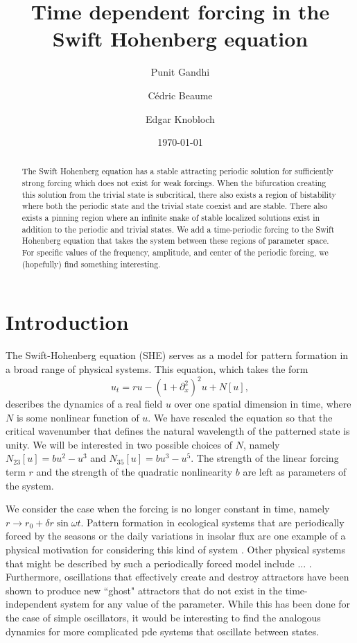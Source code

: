 \documentclass[pre,preprint,superscriptaddress]{revtex4-1}
\begin{document}
\title{Time dependent forcing in the Swift Hohenberg equation}
\author{Punit Gandhi}
\author{C\'edric Beaume}
\author{Edgar Knobloch}
\date{\today}

\begin{abstract}
The Swift Hohenberg equation has a stable attracting periodic solution for sufficiently strong forcing which does not exist for weak forcings.  When the bifurcation creating this solution from the trivial state is subcritical, there also exists a region of bistability where both the periodic state and the trivial state coexist and are stable.  There also exists a pinning region where an infinite snake of stable localized solutions exist in addition to the periodic and trivial states.   We add a time-periodic forcing to the Swift Hohenberg equation that takes the system between these regions of parameter space.  For specific values of the frequency, amplitude, and center of the periodic forcing, we (hopefully) find something interesting.
\end{abstract}

\maketitle

\section{Introduction}
The Swift-Hohenberg equation (SHE) serves as a model for pattern formation in a broad range of physical systems.   This equation, which takes the form  
\begin{equation}
u_t= r u-\left(1+\partial_{x}^2\right)^2u+N[u]\label{eq:SH},
\end{equation}
describes the dynamics of a real field $u$ over one spatial dimension in time, where $N$ is some nonlinear function of $u$.  We have rescaled the equation so that the critical wavenumber that defines the natural wavelength of the patterned state is unity.  We will be interested in two possible choices of $N$, namely $N_{23}[u]=bu^2-u^3$ and $N_{35}[u]=b u^3-u^5$.  The strength of the linear forcing term $r$ and the strength of the quadratic nonlinearity $b$ are left as parameters of the system.  

We consider the case when the forcing is no longer constant in time, namely $r\rightarrow r_0+\delta r \sin\omega t$.  Pattern formation in ecological systems that are periodically forced by the seasons or the daily variations in insolar flux are one example of a physical motivation for considering this kind of system \cite{}.  Other physical systems that might be described by such a periodically forced model include ... \cite{}.   Furthermore, oscillations that effectively create and destroy attractors have been shown to produce new ``ghost" attractors that do not exist in the time-independent system for any value of the parameter\cite{}.  While this has been done for the case of simple oscillators, it would be interesting to find the analogous dynamics for more complicated pde systems that oscillate between states.
\end{document}
